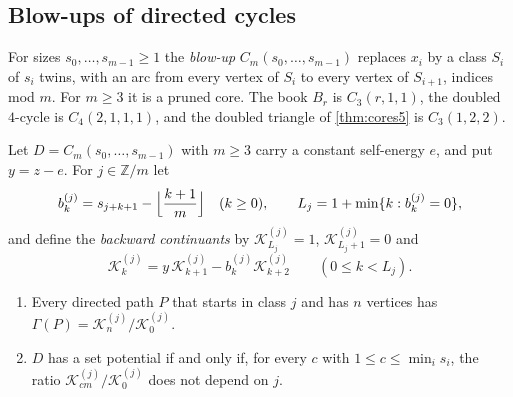 \documentclass[final]{siamart0516}
\numberwithin{theorem}{section}
\numberwithin{equation}{section}
\theoremstyle{siamnonum}
\theoremstyle{plain}
\newcommand{\ZZ}{\mathbb{Z}}
\newcommand{\cont}{\mathcal{K}}           %
\begin{document}
\subsection{Blow-ups of directed cycles}
For sizes $s_0,\dots,s_{m-1}\ge1$ the \emph{blow-up} $C_m(s_0,\dots,s_{m-1})$ replaces $x_i$ by a class $S_i$ of $s_i$ twins, with an arc from every vertex of $S_i$ to every vertex of $S_{i+1}$, indices mod $m$. For $m\ge3$ it is a pruned core. The book $B_r$ is $C_3(r,1,1)$, the doubled $4$-cycle is $C_4(2,1,1,1)$, and the doubled triangle of \cref{thm:cores5} is $C_3(1,2,2)$.

\begin{theorem}\label{thm:blowup-criterion}
Let $D=C_m(s_0,\dots,s_{m-1})$ with $m\ge3$ carry a constant self-energy $e$, and put $y=z-e$. For $j\in\ZZ/m$ let
\[
b^{(j)}_k=s_{j+k+1}-\Bigl\lfloor\frac{k+1}{m}\Bigr\rfloor\quad(k\ge0),\qquad L_j=1+\min\{k:b^{(j)}_k=0\},
\]
and define the \emph{backward continuants} by $\cont^{(j)}_{L_j}=1$, $\cont^{(j)}_{L_j+1}=0$ and
\[
\cont^{(j)}_k=y\,\cont^{(j)}_{k+1}-b^{(j)}_k\cont^{(j)}_{k+2}\qquad(0\le k<L_j).
\]
\begin{enumerate}[label=\textup{(\arabic*)}]
\item Every directed path $P$ that starts in class $j$ and has $n$ vertices has $\Gamma(P)=\cont^{(j)}_n/\cont^{(j)}_0$.
\item $D$ has a set potential if and only if, for every $c$ with $1\le c\le\min_is_i$, the ratio $\cont^{(j)}_{cm}/\cont^{(j)}_0$ does not depend on $j$.
\end{enumerate}
\end{theorem}
\end{document}
